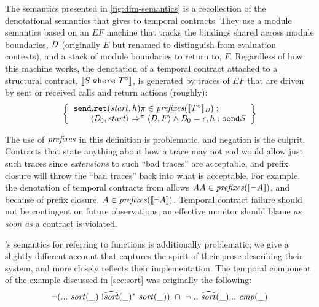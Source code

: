 %
The semantics presented in \autoref{fig:dfm-semantics} is a recollection of the denotational semantics that \dfm{} gives to temporal contracts.
%
They use a module semantics based on an $\mathit{EF}$ machine that tracks the bindings shared across module boundaries, $\mathit{D}$ (originally $E$ but renamed to distinguish from evaluation contexts), and a stack of module boundaries to return to, $F$.
%
Regardless of how this machine works, the denotation of a temporal contract attached to a structural contract, $[\![ S\ {\tt where}\ T^\circ ]\!]$, is generated by traces of $\mathit{EF}$ that are driven by sent or received calls and return actions (roughly):
\begin{align*}
 \left\{
   \begin{array}{l}
    {\tt send.ret}(\mathit{start},h)\pi \in \mathit{prefixes}([\![ T^\circ ]\!]_{\mathit{D}}) :
 \\ \qquad\langle \mathit{D}_0, \mathit{start}\rangle \Rightarrow^\pi \langle \mathit{D}, F\rangle \wedge \mathit{D}_0 = \epsilon, h : {\tt send}S
\end{array}\right\}
\end{align*}

The use of $\mathit{prefixes}$ in this definition is problematic, and negation is the culprit.
%
Contracts that state anything about how a trace may not end would allow just such traces since \emph{extensions} to such ``bad traces'' are acceptable, and prefix closure will throw the ``bad traces'' back into what is acceptable.
%
%
For example, the denotation of temporal contracts from \dfm{} allows $AA \in \mathit{prefixes}([\![ \neg A ]\!])$, and because of prefix closure, $A \in \mathit{prefixes}([\![ \neg A ]\!])$.
%
Temporal contract failure should not be contingent on future observations; an effective monitor should blame \emph{as soon as} a contract is violated.

\dfm's semantics for referring to functions is additionally problematic; we give a slightly different account that captures the spirit of their prose describing their system, and more closely reflects their implementation.
%
The temporal component of the example discussed in \autoref{sec:sort} was originally the following:
\begin{align*}
 \neg ({\tt ...}~ \mathit{sort}(\_)~ ! \widehat{\mathit{sort}}(\_)^*~ \mathit{sort}(\_)) 
 \ \cap\  \neg {\tt ...}~ \widehat{\mathit{sort}}(\_) {\tt ...}~ \mathit{cmp}(\_)
\end{align*}

